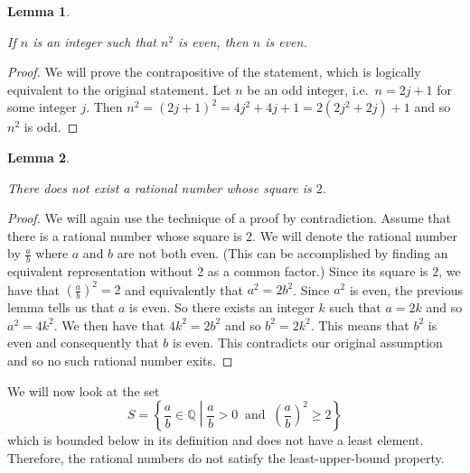 \documentclass[
]{book}
\newtheorem{lemma}{Lemma}[chapter]
\theoremstyle{definition}
\theoremstyle{definition}
\theoremstyle{definition}
\theoremstyle{definition}
\theoremstyle{remark}
\begin{document}
\begin{lemma}
\protect\hypertarget{lem:unlabeled-div-48}{}\label{lem:unlabeled-div-48}

If \(n\) is an integer such that \(n^2\) is even, then \(n\) is even.

\end{lemma}

\begin{proof}

We will prove the contrapositive of the statement, which is logically equivalent to the original statement. Let \(n\) be an odd integer, i.e.~\(n=2j+1\) for some integer \(j\). Then \(n^2=(2j+1)^2=4j^2+4j+1=2(2j^2+2j)+1\) and so \(n^2\) is odd.

\end{proof}

\begin{lemma}
\protect\hypertarget{lem:unlabeled-div-50}{}\label{lem:unlabeled-div-50}

There does not exist a rational number whose square is \(2\).

\end{lemma}

\begin{proof}

We will again use the technique of a proof by contradiction. Assume that there is a rational number whose square is \(2\). We will denote the rational number by \(\frac{a}{b}\) where \(a\) and \(b\) are not both even. (This can be accomplished by finding an equivalent representation without 2 as a common factor.) Since its square is \(2\), we have that \(\left(\frac{a}{b}\right)^2 =2\) and equivalently that \(a^2 = 2 b^2\). Since \(a^2\) is even, the previous lemma tells us that \(a\) is even. So there exists an integer \(k\) such that \(a=2k\) and so \(a^2=4k^2\). We then have that \(4k^2=2b^2\) and so \(b^2=2k^2\). This means that \(b^2\) is even and consequently that \(b\) is even. This contradicts our original assumption and so no such rational number exits.

\end{proof}

We will now look at the set
\[S = \left\{ \frac{a}{b}\in \mathbb{Q} \middle \vert \frac{a}{b} >0 \: \mbox{ and } \: \left(\frac{a}{b}\right)^2 \geq 2\right\}\] which is bounded below in its definition and does not have a least element. Therefore, the rational numbers do not satisfy the least-upper-bound property.
\end{document}
